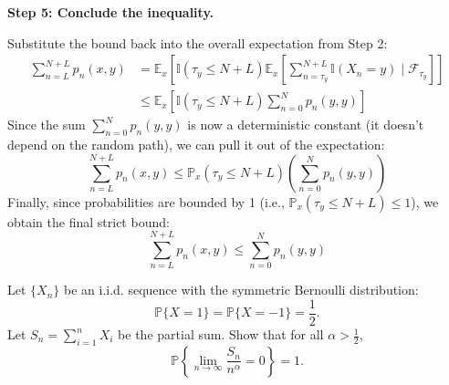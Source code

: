 \begin{solution}
\textbf{Step 5: Conclude the inequality.}

Substitute the bound back into the overall expectation from Step 2:
\begin{align*}
\sum_{n=L}^{N+L} p_n(x,y) &= \mathbb{E}_x \left[ \mathbb{I}(\tau_y \leq N+L) \mathbb{E}_x \left[ \sum_{n=\tau_y}^{N+L} \mathbb{I}(X_n = y) \mid \mathcal{F}_{\tau_y} \right] \right] \\
&\leq \mathbb{E}_x \left[ \mathbb{I}(\tau_y \leq N+L) \sum_{n=0}^N p_n(y,y) \right]
\end{align*}
Since the sum $\sum_{n=0}^N p_n(y,y)$ is now a deterministic constant (it doesn't depend on the random path), we can pull it out of the expectation:
\[ \sum_{n=L}^{N+L} p_n(x,y) \leq \mathbb{P}_x(\tau_y \leq N+L) \left( \sum_{n=0}^N p_n(y,y) \right) \]
Finally, since probabilities are bounded by 1 (i.e., $\mathbb{P}_x(\tau_y \leq N+L) \leq 1$), we obtain the final strict bound:
\[ \sum_{n=L}^{N+L} p_n(x,y) \leq \sum_{n=0}^N p_n(y,y) \]
\end{solution}

\begin{exercise}\label{probability:2023:3}
Let $\{X_n\}$ be an i.i.d. sequence with the symmetric Bernoulli distribution:
\[
\mathbb{P}\{X = 1\} = \mathbb{P}\{X = -1\} = \frac{1}{2}.
\]
Let $S_n = \sum_{i=1}^n X_i$ be the partial sum. Show that for all $\alpha > \frac{1}{2}$,
\[
\mathbb{P}\left\{\lim_{n \to \infty} \frac{S_n}{n^\alpha} = 0\right\} = 1.
\]
\end{exercise}

